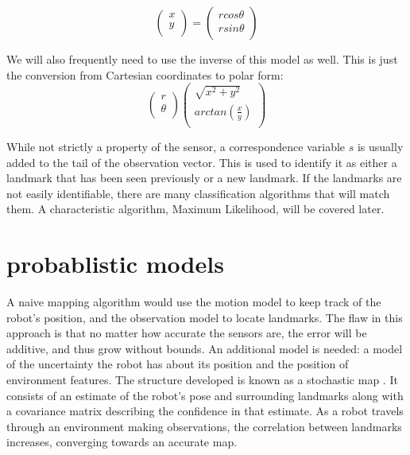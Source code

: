 \documentclass[12pt]{report}
\begin{document}
\begin{equation}\label{pol2cart}
\begin{pmatrix}
 x \\
 y \\
\end{pmatrix} =
\begin{pmatrix}
 r cos \theta \\
 r sin \theta  \\
\end{pmatrix}
\end{equation}

We will also frequently need to use the inverse of this model as well.  This is just the conversion from Cartesian coordinates to polar form:
\begin{equation}\label{cart2pol}
\begin{pmatrix}
 r \\
 \theta \\
\end{pmatrix}
\begin{pmatrix}
 \sqrt{x^2 + y^2}  \\
 arctan(\frac{x}{y}) \\
\end{pmatrix}
\end{equation}

While not strictly a property of the sensor, a correspondence variable $s$ is usually added to the tail of the observation vector.  This is used to identify it as either a landmark that has been seen previously or a new landmark.  If the landmarks are not easily identifiable, there are many classification algorithms that will match them.  A characteristic algorithm, Maximum Likelihood, will be covered later. 

\section{probablistic models}
A naive mapping algorithm would use the motion model to keep track of the robot's position, and the observation model to locate landmarks.  The flaw in this approach is that no matter how accurate the sensors are, the error will be additive, and thus grow without bounds.  An additional model is needed: a model of the uncertainty the robot has about its position and the position of environment features.  The structure developed is known as a stochastic map \cite{cheeseman1987stochastic}.  It consists of an estimate of the robot's pose and surrounding landmarks along with a covariance matrix describing the confidence in that estimate.  As a robot travels through an environment making observations, the correlation between landmarks increases, converging towards an accurate map.  
\end{document}

